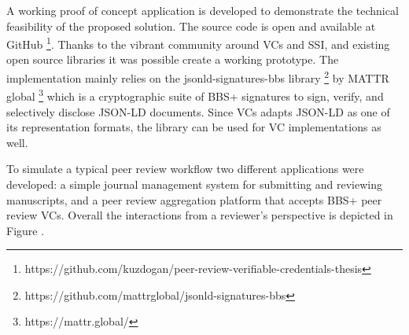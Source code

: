 A working proof of concept application is developed to demonstrate the technical feasibility of the proposed solution. The source code is open and available at GitHub \footnote{https://github.com/kuzdogan/peer-review-verifiable-credentials-thesis}. Thanks to the vibrant community around VCs and SSI, and existing open source libraries it was possible create a working prototype. The implementation mainly relies on the jsonld-signatures-bbs library \footnote{https://github.com/mattrglobal/jsonld-signatures-bbs} by MATTR global \footnote{https://mattr.global/} which is a cryptographic suite of BBS+ signatures to sign, verify, and selectively disclose JSON-LD documents. Since VCs adapts JSON-LD as one of its representation formats, the library can be used for VC implementations as well.

To simulate a typical peer review workflow two different applications were developed: a simple journal management system for submitting and reviewing manuscripts, and a peer review aggregation platform that accepts BBS+ peer review VCs. Overall the interactions from a reviewer's perspective is depicted in Figure .

